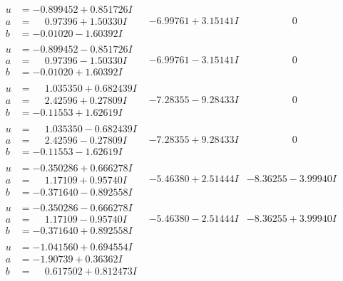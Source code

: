 \documentclass[1p]{elsarticle_modified}
\theoremstyle{definition}
\begin{document}
$$\begin{array}{c|c|c}
 \hline 
\begin{aligned}
u &= -0.899452 + 0.851726 I \\
a &= \phantom{-}0.97396 + 1.50330 I \\
b &= -0.01020 - 1.60392 I\end{aligned}
 & -6.99761 + 3.15141 I & \phantom{-0.000000 } 0 \\ \hline\begin{aligned}
u &= -0.899452 - 0.851726 I \\
a &= \phantom{-}0.97396 - 1.50330 I \\
b &= -0.01020 + 1.60392 I\end{aligned}
 & -6.99761 - 3.15141 I & \phantom{-0.000000 } 0 \\ \hline\begin{aligned}
u &= \phantom{-}1.035350 + 0.682439 I \\
a &= \phantom{-}2.42596 + 0.27809 I \\
b &= -0.11553 + 1.62619 I\end{aligned}
 & -7.28355 - 9.28433 I & \phantom{-0.000000 } 0 \\ \hline\begin{aligned}
u &= \phantom{-}1.035350 - 0.682439 I \\
a &= \phantom{-}2.42596 - 0.27809 I \\
b &= -0.11553 - 1.62619 I\end{aligned}
 & -7.28355 + 9.28433 I & \phantom{-0.000000 } 0 \\ \hline\begin{aligned}
u &= -0.350286 + 0.666278 I \\
a &= \phantom{-}1.17109 + 0.95740 I \\
b &= -0.371640 - 0.892558 I\end{aligned}
 & -5.46380 + 2.51444 I & -8.36255 - 3.99940 I \\ \hline\begin{aligned}
u &= -0.350286 - 0.666278 I \\
a &= \phantom{-}1.17109 - 0.95740 I \\
b &= -0.371640 + 0.892558 I\end{aligned}
 & -5.46380 - 2.51444 I & -8.36255 + 3.99940 I \\ \hline\begin{aligned}
u &= -1.041560 + 0.694554 I \\
a &= -1.90739 + 0.36362 I \\
b &= \phantom{-}0.617502 + 0.812473 I\end{aligned}

\end{array}$$
\end{document}
